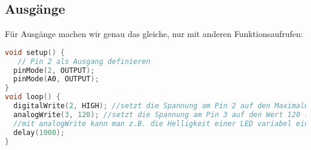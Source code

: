 \subsection{\large{Ausgänge}}
Für Ausgänge machen wir genau das gleiche, nur mit anderen Funktionsaufrufen:
\begin{lstlisting}[language=c, caption=Ausgänge am Arduino nutzen]
void setup() {
   // Pin 2 als Ausgang definieren
  pinMode(2, OUTPUT); 
  pinMode(A0, OUTPUT);
}
void loop() {
  digitalWrite(2, HIGH); //setzt die Spannung am Pin 2 auf den Maximalwert
  analogWrite(3, 120); //setzt die Spannung am Pin 3 auf den Wert 120 (Maximal gehen 255)
  //mit analogWrite kann man z.B. die Helligkeit einer LED variabel einstellen, wenn die LED das erlaubt
  delay(1000);
}
\end{lstlisting}
